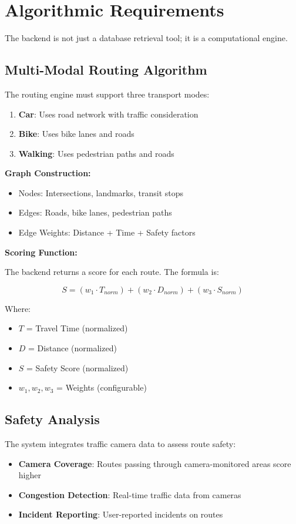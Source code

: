 \section{Algorithmic Requirements}

The backend is not just a database retrieval tool; it is a computational engine.

\subsection{Multi-Modal Routing Algorithm}

The routing engine must support three transport modes:
\begin{enumerate}
    \item \textbf{Car}: Uses road network with traffic consideration
    \item \textbf{Bike}: Uses bike lanes and roads
    \item \textbf{Walking}: Uses pedestrian paths and roads
\end{enumerate}

\textbf{Graph Construction:}
\begin{itemize}
    \item Nodes: Intersections, landmarks, transit stops
    \item Edges: Roads, bike lanes, pedestrian paths
    \item Edge Weights: Distance + Time + Safety factors
\end{itemize}

\textbf{Scoring Function:}

The backend returns a score for each route. The formula is:

\[
S = (w_1 \cdot T_{norm}) + (w_2 \cdot D_{norm}) + (w_3 \cdot S_{norm})
\]

Where:
\begin{itemize}
    \item $T$ = Travel Time (normalized)
    \item $D$ = Distance (normalized)
    \item $S$ = Safety Score (normalized)
    \item $w_1, w_2, w_3$ = Weights (configurable)
\end{itemize}

\subsection{Safety Analysis}

The system integrates traffic camera data to assess route safety:
\begin{itemize}
    \item \textbf{Camera Coverage}: Routes passing through camera-monitored areas score higher
    \item \textbf{Congestion Detection}: Real-time traffic data from cameras
    \item \textbf{Incident Reporting}: User-reported incidents on routes
\end{itemize}
